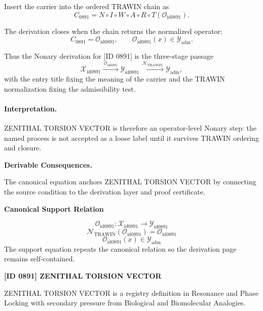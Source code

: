 Insert the carrier into the ordered TRAWIN chain as\[
C_{0891}=N\circ I\circ W\circ A\circ R\circ T(\mathcal{O}_{\mathrm{id0891}}).
\]

The derivation closes when the chain returns the normalized operator:\[
C_{0891}=\mathcal{O}_{\mathrm{id0891}},\qquad \mathcal{O}_{\mathrm{id0891}}(x)\in\mathcal{Y}_{\mathrm{adm}}.
\]

Thus the Nonary derivation for [ID 0891] is the three-stage passage
\[
\mathcal{X}_{\mathrm{id0891}}\xrightarrow{\,\mathcal{O}_{\mathrm{id0891}}\,} \mathcal{Y}_{\mathrm{id0891}}\xrightarrow{\,\mathcal{N}_{\mathrm{TRAWIN}}\,} \mathcal{Y}_{\mathrm{adm}},
\]
with the entry title fixing the meaning of the carrier and the TRAWIN normalization fixing the admissibility test.

\paragraph{Interpretation.} ZENITHAL TORSION VECTOR is therefore an operator-level Nonary step: the named process is not accepted as a loose label until it survives TRAWIN ordering and closure.

\par\vspace{0.35em}
\noindent\textbf{Derivable Consequences.}\quad
\begingroup
\footnotesize
\raggedright
The canonical equation anchors ZENITHAL TORSION VECTOR by connecting the source condition to the derivation layer and proof certificate.
\par\endgroup

\noindent\textbf{Canonical Support Relation}\par
\[
\mathcal{O}_{\mathrm{id0891}}:\mathcal{X}_{\mathrm{id0891}}\longrightarrow\mathcal{Y}_{\mathrm{id0891}}
\]
\[
\mathcal{N}_{\mathrm{TRAWIN}}(\mathcal{O}_{\mathrm{id0891}})=\mathcal{O}_{\mathrm{id0891}}
\]
\[
\mathcal{O}_{\mathrm{id0891}}(x)\in\mathcal{Y}_{\mathrm{adm}}
\]
\noindent The support equation repeats the canonical relation so the derivation page remains self-contained.\par

\clearpage
\noindent\textbf{[ID 0891] ZENITHAL TORSION VECTOR}\par
\vspace{0.35em}
\begingroup\small
{}
ZENITHAL TORSION VECTOR is a registry definition in Resonance and Phase Locking with secondary pressure from Biological and Biomolecular Analogies.

